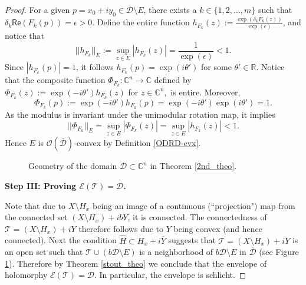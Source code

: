 \documentclass[12pt,reqno, a4paper]{amsart}
\theoremstyle{definition}
\theoremstyle{definition}
\numberwithin{equation}{section}
\def\R{\mathbb{R}}                              %
\def\C{\mathbb{C}}                              %
\def\eps{\epsilon}
\begin{document}
\begin{proof}
	\vspace*{-.3cm} 
	
	For a given $p=x_0+iy_0\in \overline{\mathcal{D}}\setminus E$, there exists a ${k\in \{1,2,\ldots,m\}}$ such that $\delta_k\textsf{Re}(F_k(p))=\eps>0$.  
	Define the entire function ${h_{F_k}(z):=\frac{\exp(\delta_kF_k(z))}{\exp(\epsilon)}}$, and notice that  $$||h_{F_k}||_{E}:=\sup_{z\in E}|h_{F_k}(z)|= \frac{1}{\exp(\epsilon)}<1.$$
Since $|h_{F_k}(p)|=1$, it follows $h_{F_k}(p)=\exp(i\theta')$ for some $\theta'\in \R$. Notice that the  composite function $\Phi_{F_k}:\C^n \to \C$ defined by $\Phi_{F_k}(z):=\exp(-i\theta')h_{F_k}(z)$ for $z\in \C^n,$ is entire. Moreover, $$\Phi_{F_k}(p):=\exp(-i\theta')h_{F_k}(p)=\exp(-i\theta')\exp(i\theta')=1.$$ As the modulus is invariant under the unimodular rotation map, it implies $$||\Phi_{F_k}||_{E}=\sup\limits_{z\in E}|\Phi_{F_k}(z)|=\sup\limits_{z\in E}|h_{F_k}(z)|<1.$$ Hence $E$ is  $\mathcal{O}(\overline{\mathcal{D}})$-convex by Definition \ref{ODRD-cvx}.\\
	
	
	\begin{figure}[!htb]
		\centering
		\vspace*{-4.6cm}
		\def\svgwidth{\linewidth}
		\fontsize{12pt}{1em}
		\scalebox{.75}{}
		\vspace*{-4.9cm}
		\caption{Geometry of the domain $\mathcal{D}\subset \C^n$ in Theorem \ref{2nd_theo}.}
		\label{reF_theo}
	\end{figure}

	
	\noindent \textbf{Step III: Proving $\mathcal{E}(\mathcal{T})=\mathcal{D}$.}\\ 
	
	\vspace*{-.3cm} 
	
	Note that due to $X\setminus H_x$ being an image of a continuous (``projection") map from the connected set $(X\setminus H_x)+ibY$, it is connected. The connectedness of ${\mathcal{T}={(X\setminus H_x)+iY}}$ therefore follows due to $Y$ being convex (and hence connected). Next the condition $\widehat{H}\subset H_x+i\overline{Y}$ suggests that 
	$\mathcal{T}=(X\setminus H_x)+iY$ is an open set such that $\mathcal{T} \cup (b\mathcal{D}\setminus E)$ is a
	neighborhood of $ b \mathcal{D}\setminus E$ in $\overline{\mathcal{D}}$ (see Figure \ref{reF_theo}). Therefore by Theorem \ref{stout_theo} we conclude that the envelope of holomorphy $\mathcal{E}(\mathcal{T})=\mathcal{D}$. In particular, the envelope is schlicht.
\end{proof}
\end{document}
